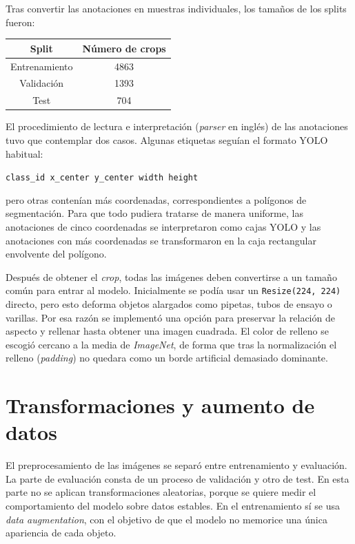 Tras convertir las anotaciones en muestras individuales, los tamaños de los splits fueron:

\begin{center}
\begin{tabular}{c|c}
\textbf{Split} & \textbf{Número de crops} \\
\hline
Entrenamiento & 4863 \\
Validación & 1393 \\
Test & 704 \\
\end{tabular}
\end{center}

El procedimiento de lectura e interpretación (\textit{parser} en inglés) de las anotaciones tuvo que contemplar dos casos. Algunas etiquetas seguían el formato YOLO habitual:

\begin{center}
\texttt{class\_id x\_center y\_center width height}
\end{center}

pero otras contenían más coordenadas, correspondientes a polígonos de segmentación. Para que todo pudiera tratarse de manera uniforme, las anotaciones de cinco coordenadas se interpretaron como cajas YOLO y las anotaciones con más coordenadas se transformaron en la caja rectangular envolvente del polígono.

Después de obtener el \textit{crop}, todas las imágenes deben convertirse a un tamaño común para entrar al modelo. Inicialmente se podía usar un \texttt{Resize(224, 224)} directo, pero esto deforma objetos alargados como pipetas, tubos de ensayo o varillas. Por esa razón se implementó una opción para preservar la relación de aspecto y rellenar hasta obtener una imagen cuadrada. El color de relleno se escogió cercano a la media de \textit{ImageNet}, de forma que tras la normalización el relleno (\textit{padding}) no quedara como un borde artificial demasiado dominante.

\section{Transformaciones y aumento de datos}

El preprocesamiento de las imágenes se separó entre entrenamiento y evaluación. La parte de evaluación consta de un proceso de validación y otro de test. En esta parte no se aplican transformaciones aleatorias, porque se quiere medir el comportamiento del modelo sobre datos estables. En el entrenamiento sí se usa \textit{data augmentation}, con el objetivo de que el modelo no memorice una única apariencia de cada objeto.

